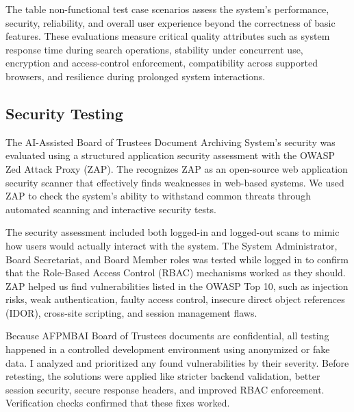 The table non-functional test case scenarios assess the system’s performance, security, reliability, and overall user experience beyond the correctness of basic features. These evaluations measure critical quality attributes such as system response time during search operations, stability under concurrent use, encryption and access-control enforcement, compatibility across supported browsers, and resilience during prolonged system interactions.




    \subsection{Security Testing}
     The AI-Assisted Board of Trustees Document Archiving System's security was evaluated using a structured application security assessment with the OWASP Zed Attack Proxy (ZAP). The \cite{OWASPZAP2024} recognizes ZAP as an open-source web application security scanner that effectively finds weaknesses in web-based systems. We used ZAP to check the system's ability to withstand common threats through automated scanning and interactive security tests.
     
     The security assessment included both logged-in and logged-out scans to mimic how users would actually interact with the system. The System Administrator, Board Secretariat, and Board Member roles was tested while logged in to confirm that the Role-Based Access Control (RBAC) mechanisms worked as they should. ZAP helped us find vulnerabilities listed in the OWASP Top 10, such as injection risks, weak authentication, faulty access control, insecure direct object references (IDOR), cross-site scripting, and session management flaws.

    Because AFPMBAI Board of Trustees documents are confidential, all testing happened in a controlled development environment using anonymized or fake data. I analyzed and prioritized any found vulnerabilities by their severity. Before retesting, the solutions were applied like stricter backend validation, better session security, secure response headers, and improved RBAC enforcement. Verification checks confirmed that these fixes worked.

